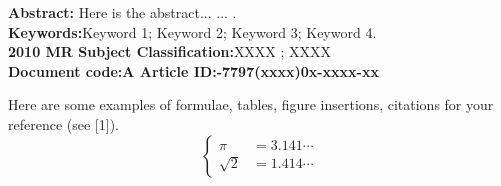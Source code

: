 \documentclass[A4paper,11pt,onecolumn,twoside]{ctexart}
\begin{document}
\date{}  %
\maketitle \vspace{-8mm}

\begin{center}
\begin{minipage}[c]{14cm}
\mbox{}\hspace{2.3em}\textbf{Abstract: }
Here is the abstract... ... .\\
\mbox{}\hspace{2.3em}\textbf{Keywords:}\quad Keyword 1; Keyword 2; Keyword 3; Keyword 4.\\
\mbox{}\hspace{2.3em}\textbf{2010 MR  Subject Classification:}\quad XXXX ; XXXX\\
\mbox{}\hspace{2.3em}\textbf{Document code:\quad A \quad
\quad\quad\quad Article ID:-7797(xxxx)0x-xxxx-xx}
\end{minipage}
\end{center}



\vskip 2mm  \vskip 3mm
\setcounter{section}{1}\setcounter{equation}{0}

\vskip 4mm  \vskip 3mm
\setcounter{section}{2}\setcounter{equation}{0}

Here are some examples of formulae, tables, figure insertions,
citations for your reference (see [1]).
\begin{equation} \label{eq:1}
\left\{ \begin{aligned}
         \pi &= 3.141\cdots \\
     \sqrt{2}&=1.414\cdots
         \end{aligned} \right.
\end{equation}
\end{document}

